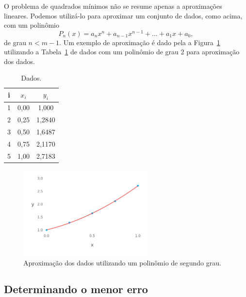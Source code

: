 \documentclass[
	12pt,				%
    oneside,			%
	a4paper,			%
	english,			%
	french,				%
	spanish,			%
	brazil,				%
	]{abntex2}
\begin{document}
        O problema de quadrados mínimos não se resume apenas a aproximações lineares. Podemos utilizá-lo para aproximar um conjunto de dados, como acima, com um polinômio
        \begin{equation*}
            P_n(x) = a_nx^n + a_{n-1}x^{n-1} + \dots + a_1x + a_0,
        \end{equation*}
        de grau $n < m-1$. Um exemplo de aproximação é dado pela a Figura~\ref{fig:lqpol} utilizando a Tabela~\ref{tab:datalq} de dados com um polinômio de grau 2 para aproximação dos dados.

            \begin{table}[ht]
                \centering
                \caption{Dados.}
                \label{tab:datalq}
                \begin{tabular}{@{}ccc@{}}
                \toprule
                i & $x_i$ & $y_i$  \\ \midrule
                1 & 0,00  & 1,000  \\
                2 & 0,25  & 1,2840 \\
                3 & 0,50  & 1,6487 \\
                4 & 0,75  & 2,1170 \\
                5 & 1,00  & 2,7183 \\ \bottomrule
                \end{tabular}
            \end{table}

        \begin{figure}[htb]
            \centering
            \includegraphics[width=0.6\textwidth]{mmq.png}
            \caption{Aproximação dos dados utilizando um polinômio de segundo grau.}
            \label{fig:lqpol}
        \end{figure}
        \subsection{Determinando o menor erro}
\end{document}
